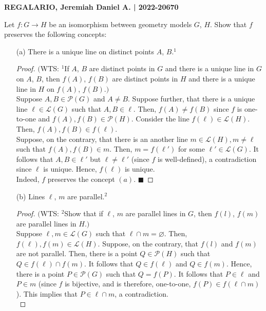 \documentclass[a4paper, 10pt]{exam}
\begin{document}
\textbf{REGALARIO, Jeremiah Daniel A. | 2022-20670}
\begin{questions}
    \question Let $f: G \to H$ be an isomorphism between geometry models $G$, $H$. Show that $f$ preserves the following concepts:
    \begin{enumerate}
      \item[(a)] There is a unique line on distinct points $A$, $B$.$^{1}$
      \begin{proof}
            $($WTS: $^1$If $A$, $B$ are distinct points in $G$ and there is a unique line in $G$ on $A$, $B$, then $f(A)$, $f(B)$ are distinct points in $H$ and there is a unique line in $H$ on $f(A)$, $f(B)$.$)$ \\
           
            Suppose $A, B \in \mathscr{P}(G)$ and $A \neq B$. Suppose further, that there is a unique line $\ell \in \mathscr{L}(G)$ such that $A, B \in \ell$. Then, $f(A) \neq f(B)$ since $f$ is one-to-one and $f(A), f(B) \in \mathscr{P}(H)$. Consider the line $f(\ell)  \in \mathscr{L}(H)$. Then, $f(A), f(B) \in f(\ell)$.\\

            Suppose, on the contrary, that there is an another line $m \in\mathscr{L}(H), m \neq \ell$ such that $f(A), f(B) \in m$. Then, $m = f(\ell')$ for some $\ell' \in \mathscr{L}(G)$. It follows that $A, B \in \ell'$ but $\ell \neq \ell'$ (since $f$ is well-defined), a contradiction since $\ell$ is unique. Hence, $f(\ell)$ is unique. \\ 

           Indeed, $f$ preserves the concept $(a)$. $\blacksquare$
        \end{proof}
      \item[(b)] Lines $\ell$, $m$ are parallel.$^{2}$
      \begin{proof}
            $($WTS: $^2$Show that if $\ell$, $m$ are parallel lines in $G$, then $f(l)$, $f(m)$ are parallel lines in $H$.$)$ \\
           
            Suppose $\ell, m \in \mathscr{L}(G)$ such that $\ell \cap m = \varnothing$. Then, $f(\ell), f(m) \in \mathscr{L}(H)$. Suppose, on the contrary, that $f(l)$ and $f(m)$ are not parallel. Then, there is a point $Q \in \mathscr{P}(H)$ such that $Q \in f(\ell) \cap f(m)$.  It follows that $Q \in f(\ell)$ and $Q \in f(m)$. Hence, there is a point $P \in \mathscr{ P }(G)$ such that $Q = f(P)$. It follows that $P \in \ell$ and $P \in m$ (since $f$ is bijective, and is therefore, one-to-one, $f(P) \in f(\ell \cap m)$). This implies that $P \in \ell \cap m$, a contradiction.\\
           

\end{proof}
\end{enumerate}
\end{questions}
\end{document}
